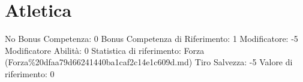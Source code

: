 \section{Atletica}\label{atletica}

\begin{description}
\tightlist
\item[Tags: ABI]
No Bonus Competenza: 0 Bonus Competenza di Riferimento: 1 Modificatore:
-5 Modificatore Abilità: 0 Statistica di riferimento: Forza
(Forza\%20dfaa79d66241440ba1caf2c14e1c609d.md) Tiro Salvezza: -5 Valore
di riferimento: 0
\end{description}
